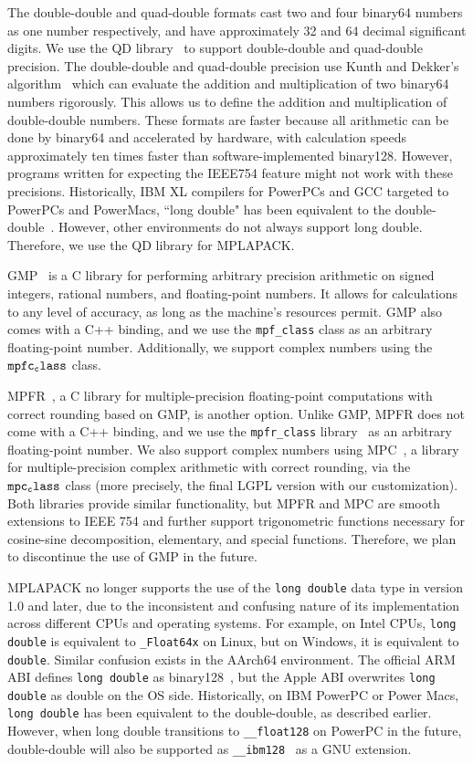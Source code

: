 \documentclass[12pt]{article}
\begin{document}
The double-double and quad-double formats cast two and four binary64 numbers as one number respectively, and have approximately 32 and 64 decimal significant digits. We use the QD library~\cite{hida2000} to support double-double and quad-double precision. The double-double and quad-double precision use Kunth and Dekker's algorithm~\cite{Knuth1997,Dekker1971} which can evaluate the addition and multiplication of two binary64 numbers rigorously. This allows us to define the addition and multiplication of double-double numbers. These formats are faster because all arithmetic can be done by binary64 and accelerated by hardware, with calculation speeds approximately ten times faster than software-implemented binary128. However, programs written for expecting the IEEE754 feature might not work with these precisions. Historically, IBM XL compilers for PowerPCs and GCC targeted to PowerPCs and PowerMacs, ``long double" has been equivalent to the double-double~\cite{ibmdd}. However, other environments do not always support long double. Therefore, we use the QD library for MPLAPACK.

GMP~\cite{Granlund12} is a C library for performing arbitrary precision arithmetic on signed integers, rational numbers, and floating-point numbers. It allows for calculations to any level of accuracy, as long as the machine's resources permit. GMP also comes with a C++ binding, and we use the {\tt mpf\_class} class as an arbitrary floating-point number. Additionally, we support complex numbers using the ${\tt mpfc_class}$ class.

MPFR~\cite{10.1145/1236463.1236468}, a C library for multiple-precision floating-point computations with correct rounding based on GMP, is another option. Unlike GMP, MPFR does not come with a C++ binding, and we use the {\tt mpfr_class} library~\cite{mpfr_class} as an arbitrary floating-point number. We also support complex numbers using MPC~\cite{MPC}, a library for multiple-precision complex arithmetic with correct rounding, via the ${\tt mpc_class}$ class (more precisely, the final LGPL version with our customization). Both libraries provide similar functionality, but MPFR and MPC are smooth extensions to IEEE 754 and further support trigonometric functions necessary for cosine-sine decomposition, elementary, and special functions. Therefore, we plan to discontinue the use of GMP in the future.

MPLAPACK no longer supports the use of the {\tt long double} data type in version 1.0 and later, due to the inconsistent and confusing nature of its implementation across different CPUs and operating systems. For example, on Intel CPUs, {\tt long double} is equivalent to {\tt \_Float64x} on Linux, but on Windows, it is equivalent to {\tt double}. Similar confusion exists in the AArch64 environment. The official ARM ABI defines {\tt long double} as binary128~\cite{arm64abi}, but the Apple ABI overwrites {\tt long double} as double on the OS side. Historically, on IBM PowerPC or Power Macs, {\tt long double} has been equivalent to the double-double, as described earlier. However, when long double transitions to {\tt \_\_float128} on PowerPC in the future, double-double will also be supported as {\tt \_\_ibm128}~\cite{ibmdd} as a GNU extension.
\end{document}
